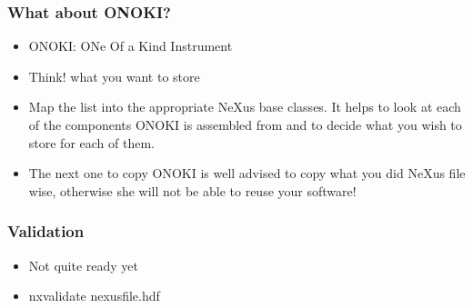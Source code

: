 \documentclass{beamer}
\begin{document}
\begin{frame} \frametitle{What about ONOKI?}
\begin{itemize}
\item<1->ONOKI: ONe Of a Kind Instrument
\item<2->{\color{blue}Think!} what you want to store
\item<3->{\color{blue}Map} the list into the appropriate NeXus base classes. It helps to 
 look at each of the components ONOKI is assembled from and to decide what you wish 
 to store for each of them. 
\item<4->The next one to copy ONOKI is well advised to copy what you did NeXus file wise, 
 otherwise she will not be able to reuse your software!
\end{itemize}
\end{frame}

\begin{frame}
\frametitle{Validation}
\begin{itemize}
\item Not quite ready yet
\item nxvalidate  nexusfile.hdf
\end{itemize}
\end{frame}
\end{document}
